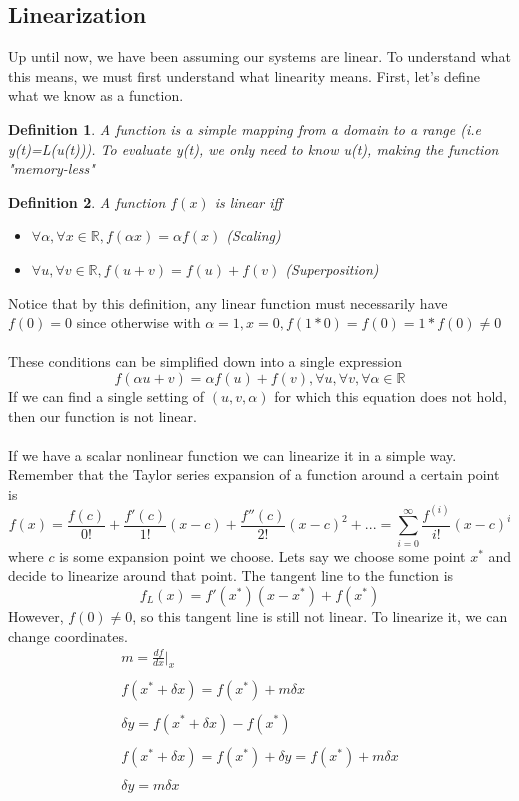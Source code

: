 \documentclass{article}
\newtheorem{definition}{Definition}
\begin{document}
\subsection{Linearization}
Up until now, we have been assuming our systems are linear. To understand what this means, we must first understand what linearity means.
First, let's define what we know as a function.
\begin{definition}
    A function is a simple mapping from a domain to a range (i.e y(t)=L(u(t))). 
    To evaluate y(t), we only need to know u(t), making the function "memory-less"
\end{definition}
\begin{definition}
    A function $f(x)$ is linear iff
    \begin{itemize}
        \item $\forall \alpha, \forall x \in \mathbb{R}, f(\alpha x) = \alpha f(x)$ (Scaling)
        \item $\forall u, \forall v \in \mathbb{R}, f(u + v) = f(u)+f(v)$ (Superposition)
    \end{itemize}
\end{definition}
Notice that by this definition, any linear function must necessarily have $f(0)=0$ since otherwise with $\alpha = 1, x=0, f(1*0)=f(0)=1*f(0)\ne 0$
\\\\These conditions can be simplified down into a single expression 
$$f(\alpha u + v) = \alpha f(u) + f(v), \forall u, \forall v, \forall \alpha \in \mathbb{R}$$
If we can find a single setting of $(u, v, \alpha)$ for which this equation does not hold, then our function is not linear.
\\\\If we have a scalar nonlinear function we can linearize it in a simple way. Remember that the Taylor series expansion of a function around a certain point is
$$ f(x) = \frac{f(c)}{0!}+\frac{f'(c)}{1!}(x-c)+\frac{f''(c)}{2!}(x-c)^2+... = \sum_{i=0}^{\infty}{\frac{f^{(i)}}{i!}(x-c)^i}$$
where $c$ is some expansion point we choose. Lets say we choose some point $x^*$ and decide to linearize around that point.
The tangent line to the function is
$$f_L(x)=f'(x^*)(x-x^*)+f(x^*)$$
However, $f(0)\ne 0$, so this tangent line is still not linear. To linearize it, we can change coordinates.
\[
    \begin{array}{c}
        m = \frac{df}{dx}|_x\\\\
        f(x^*+\delta x)= f(x^*)+m \delta x\\\\
        \delta y = f(x^*+\delta x) - f(x^*)\\\\
        f(x^*+\delta x) = f(x^*)+\delta y = f(x^*)+m \delta x\\\\
        \delta y = m \delta x
    \end{array}
\]
\end{document}
